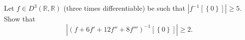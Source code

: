 \begin{problem}
    Let \( f \in D^3\left(\mathbb{R},\mathbb{R}\right) \) (three times differentiable) be such that \( \left|f^{-1}\left[\left\{0\right\}\right]\right| \geq 5 \). Show that
    \[
        \left|\left(f+6f'+12f''+8f'''\right)^{-1} \left[\left\{0\right\}\right]\right| \geq 2.
    \]
\end{problem}
